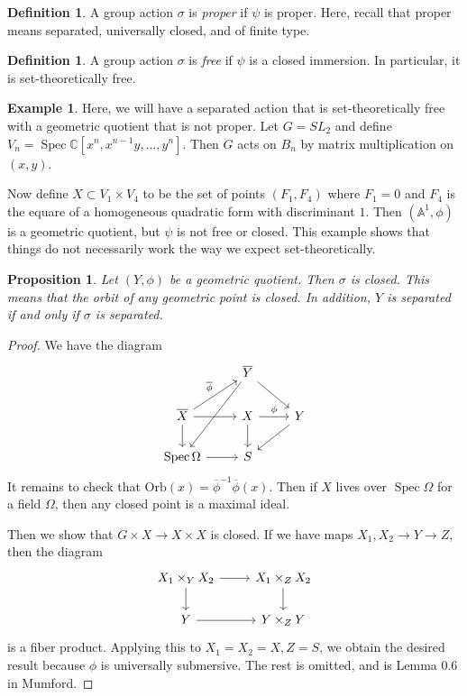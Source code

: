 \documentclass[leqno, openany]{memoir}
\newtheorem{prop}[thm]{Proposition}
\theoremstyle{definition}
\newtheorem{defn}[thm]{Definition}
\newtheorem{exm}[thm]{Example}
\theoremstyle{remark}
\theoremstyle{plain}
\theoremstyle{definition}
\theoremstyle{remark}
\newcommand{\A}{\mathbb{A}}
\newcommand{\C}{\mathbb{C}}
\newcommand{\mr}[1]{\mathrm{#1}}
\newcommand{\ol}[1]{\overline{#1}}
\DeclareMathOperator{\Spec}{Spec}
\begin{document}
\begin{defn} A group action $\sigma$ is \textit{proper} if $\psi$ is proper.
Here, recall that proper means separated, universally closed, and of finite
type.  \end{defn}

\begin{defn} A group action $\sigma$ is \textit{free} if $\psi$ is a closed
immersion. In particular, it is set-theoretically free.  \end{defn}

\begin{exm} Here, we will have a separated action that is set-theoretically
    free with a geometric quotient that is not proper. Let $G = SL_2$ and
    define $V_n = \Spec \C[x^n, x^{n-1}y, \ldots, y^n]$. Then $G$ acts on $B_n$
    by matrix multiplication on $(x,y)$.

    Now define $X \subset V_1 \times V_4$ to be the set of points $(F_1, F_4)$
where $F_1 = 0$ and $F_4$ is the equare of a homogeneous quadratic form with
discriminant $1$. Then $(\A^1, \phi)$ is a geometric quotient, but $\psi$ is
not free or closed. This example shows that things do not necessarily work the
way we expect set-theoretically.  \end{exm}

\begin{prop} Let $(Y, \phi)$ be a geometric quotient. Then $\sigma$ is closed.
This means that the orbit of any geometric point is closed. In addition, $Y$ is
separated if and only if $\sigma$ is separated.  \end{prop}

\begin{proof} We have the diagram \begin{equation} \begin{tikzcd} & \ol{Y}
\arrow{dr} \arrow{ddl} \\ \ol{X} \arrow{r} \arrow{d} \arrow{ur}{\ol{\phi}} & X
\arrow{r}{\phi} \arrow{d} & Y \arrow{dl} \\ \Spec \Omega \arrow{r} & S
\end{tikzcd} \end{equation} It remains to check that $\mr{Orb}(x) =
\ol{\phi}^{-1} \ol{\phi}(x)$. Then if $X$ lives over $\Spec \Omega$ for a field
$\Omega$, then any closed point is a maximal ideal.

    Then we show that $G \times X \to X \times X$ is closed. If we have maps
    $X_1,X_2 \to Y \to Z$, then the diagram \begin{equation} \begin{tikzcd} X_1
        \times_Y X_2 \arrow{r} \arrow{d} & X_1 \times_Z X_2 \arrow{d} \\ Y
        \arrow{r} & Y \times_Z Y \end{tikzcd} \end{equation} is a fiber
        product. Applying this to $X_1 = X_2 = X, Z = S$, we obtain the desired
        result because $\phi$ is universally submersive. The rest is omitted,
        and is Lemma {0.6} in Mumford.  \end{proof}
\end{document}
